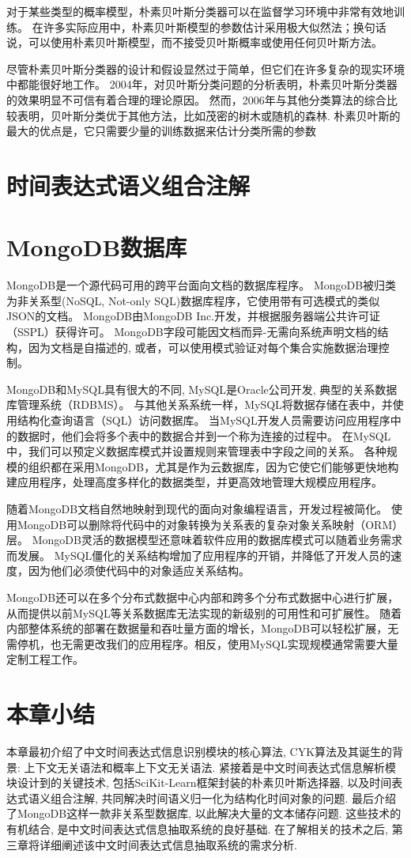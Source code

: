 对于某些类型的概率模型，朴素贝叶斯分类器可以在监督学习环境中非常有效地训练。
在许多实际应用中，朴素贝叶斯模型的参数估计采用极大似然法；换句话说，可以使用朴素贝叶斯模型，而不接受贝叶斯概率或使用任何贝叶斯方法。

尽管朴素贝叶斯分类器的设计和假设显然过于简单，但它们在许多复杂的现实环境中都能很好地工作。
2004年，对贝叶斯分类问题的分析表明，朴素贝叶斯分类器的效果明显不可信有着合理的理论原因。
然而，2006年与其他分类算法的综合比较表明，贝叶斯分类优于其他方法，比如茂密的树木或随机的森林.
朴素贝叶斯的最大的优点是，它只需要少量的训练数据来估计分类所需的参数

\section{时间表达式语义组合注解}



\section{MongoDB数据库}

MongoDB是一个源代码可用的跨平台面向文档的数据库程序。
MongoDB被归类为非关系型(NoSQL, Not-only SQL)数据库程序，它使用带有可选模式的类似JSON的文档。
MongoDB由MongoDB Inc.开发，并根据服务器端公共许可证（SSPL）获得许可。
MongoDB字段可能因文档而异-无需向系统声明文档的结构，因为文档是自描述的, 或者，可以使用模式验证对每个集合实施数据治理控制。

MongoDB和MySQL具有很大的不同, MySQL是Oracle公司开发, 典型的关系数据库管理系统（RDBMS）。
与其他关系系统一样，MySQL将数据存储在表中，并使用结构化查询语言（SQL）访问数据库。
当MySQL开发人员需要访问应用程序中的数据时，他们会将多个表中的数据合并到一个称为连接的过程中。
在MySQL中，我们可以预定义数据库模式并设置规则来管理表中字段之间的关系。
各种规模的组织都在采用MongoDB，尤其是作为云数据库，因为它使它们能够更快地构建应用程序，处理高度多样化的数据类型，并更高效地管理大规模应用程序。

随着MongoDB文档自然地映射到现代的面向对象编程语言，开发过程被简化。
使用MongoDB可以删除将代码中的对象转换为关系表的复杂对象关系映射（ORM）层。
MongoDB灵活的数据模型还意味着软件应用的数据库模式可以随着业务需求而发展。
MySQL僵化的关系结构增加了应用程序的开销，并降低了开发人员的速度，因为他们必须使代码中的对象适应关系结构。

MongoDB还可以在多个分布式数据中心内部和跨多个分布式数据中心进行扩展，从而提供以前MySQL等关系数据库无法实现的新级别的可用性和可扩展性。
随着内部整体系统的部署在数据量和吞吐量方面的增长，MongoDB可以轻松扩展，无需停机，也无需更改我们的应用程序。相反，使用MySQL实现规模通常需要大量定制工程工作。

\section{本章小结}

本章最初介绍了中文时间表达式信息识别模块的核心算法, CYK算法及其诞生的背景: 上下文无关语法和概率上下文无关语法. 
紧接着是中文时间表达式信息解析模块设计到的关键技术, 包括SciKit-Learn框架封装的朴素贝叶斯选择器, 以及时间表达式语义组合注解, 共同解决时间语义归一化为结构化时间对象的问题.
最后介绍了MongoDB这样一款非关系型数据库, 以此解决大量的文本储存问题. 这些技术的有机结合, 是中文时间表达式信息抽取系统的良好基础.
在了解相关的技术之后, 第三章将详细阐述该中文时间表达式信息抽取系统的需求分析.
